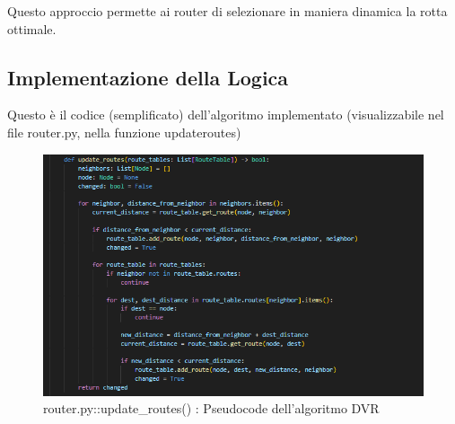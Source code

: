 \documentclass[a4paper,12pt]{report}
\begin{document}
\noindent Questo approccio permette ai router di selezionare in maniera dinamica la rotta ottimale.
\newpage
\subsection{Implementazione della Logica}
Questo è il codice (semplificato) dell'algoritmo implementato (visualizzabile nel file router.py, nella funzione updateroutes)

\begin{figure}[H] %
    \centering
    \includegraphics[width=\textwidth]{pseudocode.PNG}
    \caption{router.py::update\_routes() : Pseudocode dell'algoritmo DVR}
    \label{fig:pseudocode.PNG}
\end{figure}
\end{document}
